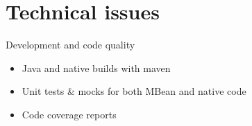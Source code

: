 \documentclass{beamer}
\begin{document}
\section{Technical issues}

	\begin{frame}{Development and code quality}

		\begin{itemize}
			\item Java and native builds with maven
			\item Unit tests \& mocks for both MBean and native code
			\item Code coverage reports
		\end{itemize}
	
	\end{frame}
\end{document}
